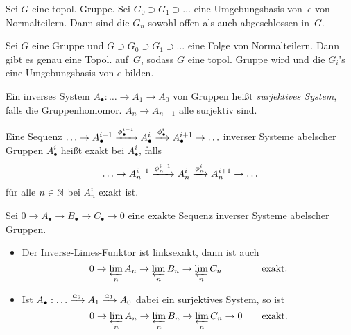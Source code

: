 \documentclass{cheat-sheet}
\begin{document}

\begin{prop}
  Sei $G$ eine topol. Gruppe.
  Sei $G_0 \supset G_1 \supset \ldots$ eine Umgebungsbasis von~$e$ von Normalteilern.
  Dann sind die $G_n$ sowohl offen als auch abgeschlossen in~$G$.
\end{prop}

\begin{bem}
  Sei $G$ eine Gruppe und $G \supset G_0 \supset G_1 \supset \ldots$ eine Folge von Normalteilern.
  Dann gibt es genau eine Topol. auf~$G$, sodass $G$ eine topol. Gruppe wird und die $G_i$'s eine Umgebungsbasis von $e$ bilden.
\end{bem}



\begin{defn}
  Ein inverses System $A_\bullet : \ldots \to A_1 \to A_0$ von Gruppen heißt \emph{surjektives System}, falls die Gruppenhomomor. $A_n \to A_{n-1}$ alle surjektiv sind.
\end{defn}

\begin{defn}
  Eine Sequenz $\ldots \to A_\bullet^{i-1} \xrightarrow{\phi_\bullet^{i-1}} A_\bullet^i \xrightarrow{\phi_\bullet^i} A_\bullet^{i+1} \to \ldots$ inverser Systeme abelscher Gruppen $A_\bullet^i$ heißt exakt bei $A_\bullet^i$, falls
  \[
    \ldots \to A_n^{i-1} \xrightarrow{\phi_n^{i-1}} A_n^i \xrightarrow{\phi_n^i} A_n^{i+1} \to \ldots
  \]
  für alle $n \in \mathbb{N}$ bei $A_n^i$ exakt ist.
\end{defn}

\begin{prop}
  Sei $0 \to A_\bullet \to B_\bullet \to C_\bullet \to 0$ eine exakte Sequenz inverser Systeme abelscher Gruppen.
  \begin{itemize}
    \item Der Inverse-Limes-Funktor ist linksexakt, \dh{} dann ist auch
    \[
      0 \to \varprojlim_n A_n \to \varprojlim_n B_n \to \varprojlim_n C_n \phantom{\to 0}\,\, \qquad
      \text{exakt.}
    \]
    \item Ist $A_\bullet : \ldots \xrightarrow{\alpha_2} A_1 \xrightarrow{\alpha_1} A_0$ dabei ein surjektives System, so ist
    \[
      0 \to \varprojlim_n A_n \to \varprojlim_n B_n \to \varprojlim_n C_n \to 0 \qquad
      \text{exakt.}
    \]
  \end{itemize}
\end{prop}
\end{document}
